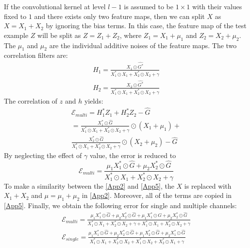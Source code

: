 \documentclass[journal]{IEEEtran}
\begin{document}
If the convolutional kernel at level $l-1$ is assumed to be $1 \times 1$ with their values fixed to $1$ and there exists only two feature maps, then we can split $X$ as $X=X_1+X_2$ by ignoring the bias terms. In this case, the feature map of the test example $Z$ will be split as $Z = Z_1 + Z_2$, where $Z_1=X_1+\mu_1$ and $Z_2=X_2+\mu_2$. The $\mu_1$ and $\mu_2$ are the individual additive noises of the feature maps. The two correlation filters are:
\begin{equation}
\label{App3}
\begin{split}
H_1 = \frac{X_1 \odot \hat{G^*}}{X_1^* \odot X_1 + X_2^* \odot X_2+ \gamma} \\ H_2 = \frac{X_2 \odot \hat{G^*}}{X_1^* \odot X_1 + X_2^* \odot X_2+ \gamma}
\end{split}
\end{equation}
The correlation of $z$ and $h$ yields:
\begin{equation}
\label{App4}
\begin{split}
\mathcal{E}_{multi}= H_1^*Z_1 + H_2^*Z_2 - \hat{G} \quad \quad \quad \quad \\
= \frac{X_1^* \odot \hat{G}}{X_1^* \odot X_1 + X_2^* \odot X_2+ \gamma} \odot (X_1 + \mu_1) + \\ \frac{X_2^* \odot \hat{G}}{X_1^* \odot X_1 + X_2^* \odot X_2+ \gamma} \odot (X_2 + \mu_2)-\hat{G}
\end{split}
\end{equation}
By neglecting the effect of $\gamma$ value, the error is reduced to
\begin{equation}
\label{App5}
\mathcal{E}_{multi}=\frac{\mu_1 X_1^* \odot \hat{G} + \mu_2 X_2^* \odot \hat{G}}{X_1^* \odot X_1 + X_2^* \odot X_2+ \gamma}
\end{equation}
To make a similarity between the \eqref{App2} and \eqref{App5}, the $X$ is replaced with $X_1+X_2$ and $\mu = \mu_1 + \mu_2$ in \eqref{App2}. Moreover, all of the terms are copied in \eqref{App5}. Finally, we obtain the following error for single and multiple channels:
\footnotesize
\begin{equation}
\label{App6}
\begin{split}
\mathcal{E}_{multi}=\frac{\mu_1 X_1^* \odot \hat{G} + \mu_2 X_2^* \odot \hat{G} + \mu_1 X_1^* \odot \hat{G} + \mu_2 X_2^* \odot \hat{G}}{X_1^* \odot X_1 + X_2^* \odot X_2+ \gamma + X_1^* \odot X_1 + X_2^* \odot X_2+ \gamma} \\
\mathcal{E}_{single}=\frac{\mu_1 X_1^* \odot \hat{G} + \mu_2 X_2^* \odot \hat{G} + \mu_1 X_2^* \odot \hat{G} + \mu_2 X_1^* \odot \hat{G}}{X_1^* \odot X_1 + X_2^* \odot X_2 + X_1^* \odot X_2 + X_2^* \odot X_1+ \gamma}
\end{split}
\end{equation}
\end{document}
